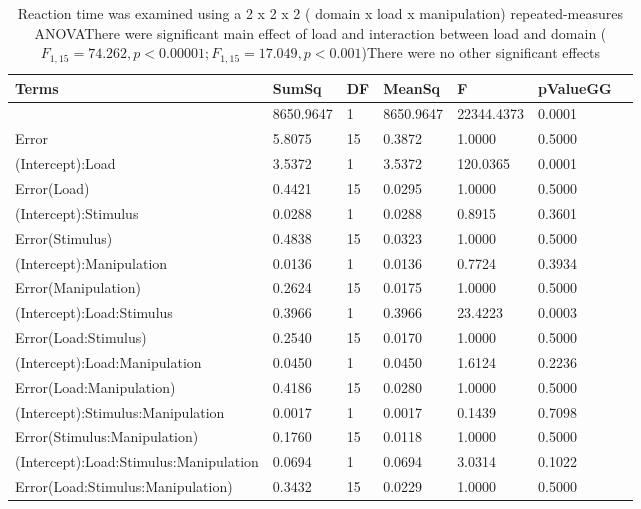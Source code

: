 \begin{table}
\centering
\begin{tabular}[0.2em]{@{}lllllll@{}}\toprule
Terms & SumSq & DF & MeanSq & F & pValueGG\\\toprule[0.2em]
(Intercept) & 8650.9647 & 1 & 8650.9647 & 22344.4373 & 0.0001 \\\midrule
Error & 5.8075 & 15 & 0.3872 & 1.0000 & 0.5000 \\\midrule
(Intercept):Load & 3.5372 & 1 & 3.5372 & 120.0365 & 0.0001 \\\midrule
Error(Load) & 0.4421 & 15 & 0.0295 & 1.0000 & 0.5000 \\\midrule
(Intercept):Stimulus & 0.0288 & 1 & 0.0288 & 0.8915 & 0.3601 \\\midrule
Error(Stimulus) & 0.4838 & 15 & 0.0323 & 1.0000 & 0.5000 \\\midrule
(Intercept):Manipulation & 0.0136 & 1 & 0.0136 & 0.7724 & 0.3934 \\\midrule
Error(Manipulation) & 0.2624 & 15 & 0.0175 & 1.0000 & 0.5000 \\\midrule
(Intercept):Load:Stimulus & 0.3966 & 1 & 0.3966 & 23.4223 & 0.0003 \\\midrule
Error(Load:Stimulus) & 0.2540 & 15 & 0.0170 & 1.0000 & 0.5000 \\\midrule
(Intercept):Load:Manipulation & 0.0450 & 1 & 0.0450 & 1.6124 & 0.2236 \\\midrule
Error(Load:Manipulation) & 0.4186 & 15 & 0.0280 & 1.0000 & 0.5000 \\\midrule
(Intercept):Stimulus:Manipulation & 0.0017 & 1 & 0.0017 & 0.1439 & 0.7098 \\\midrule
Error(Stimulus:Manipulation) & 0.1760 & 15 & 0.0118 & 1.0000 & 0.5000 \\\midrule
(Intercept):Load:Stimulus:Manipulation & 0.0694 & 1 & 0.0694 & 3.0314 & 0.1022 \\\midrule
Error(Load:Stimulus:Manipulation) & 0.3432 & 15 & 0.0229 & 1.0000 & 0.5000 \\\bottomrule[0.2em]
\end{tabular}
\caption{Reaction time was examined using a 2 x 2 x 2 ( domain x load x manipulation) repeated-measures ANOVAThere were significant main effect of load and interaction between load and domain ($F_{1,15}=74.262, p<0.00001;F_{1,15}=17.049, p<0.001$)There were no other significant effects\label{tabel:behStudy2RT}}
\end{table}
